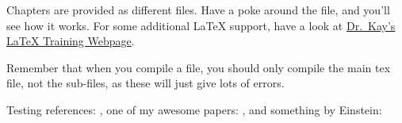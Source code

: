 Chapters are provided as different files. Have a poke around the file, and you'll see how it works. For some additional LaTeX support, have a look at \href{http://www.ma.rhul.ac.uk/akay/teaching/latex/}{Dr.\ Kay's LaTeX Training Webpage}.

Remember that when you compile a file, you should only compile the main tex file, not the sub-files, as these will just give lots of errors.

Testing references: \cite{InformationTechnologySecurity2013}, one of my awesome papers: \cite{kay2017}, and something by Einstein: \cite{einstein}